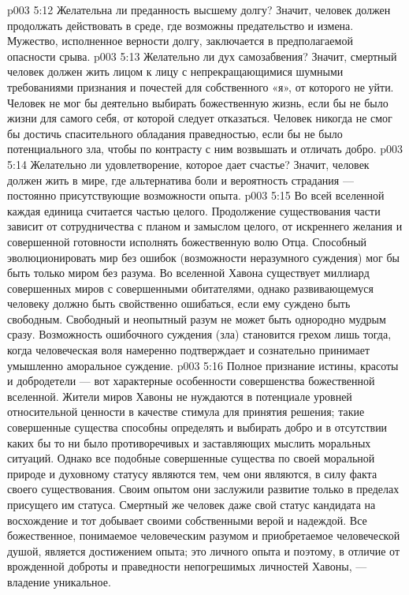 \vs p003 5:12 \bibnobreakspace Желательна ли  преданность высшему долгу? Значит, человек должен продолжать действовать в среде, где возможны предательство и измена. Мужество, исполненное верности долгу, заключается в предполагаемой опасности срыва.
\vs p003 5:13 \bibnobreakspace Желательно ли  дух самозабвения? Значит, смертный человек должен жить лицом к лицу с непрекращающимися шумными требованиями признания и почестей для собственного «я», от которого не уйти. Человек не мог бы деятельно выбирать божественную жизнь, если бы не было жизни для самого себя, от которой следует отказаться. Человек никогда не смог бы достичь спасительного обладания праведностью, если бы не было потенциального зла, чтобы по контрасту с ним возвышать и отличать добро.
\vs p003 5:14 \bibnobreakspace Желательно ли  удовлетворение, которое дает счастье? Значит, человек должен жить в мире, где альтернатива боли и вероятность страдания --- постоянно присутствующие возможности опыта.
\vs p003 5:15 \pc Во всей вселенной каждая единица считается частью целого. Продолжение существования части зависит от сотрудничества с планом и замыслом целого, от искреннего желания и совершенной готовности исполнять божественную волю Отца. Способный эволюционировать мир без ошибок (возможности неразумного суждения) мог бы быть только миром без  разума. Во вселенной Хавона существует миллиард совершенных миров с совершенными обитателями, однако развивающемуся человеку должно быть свойственно ошибаться, если ему суждено быть свободным. Свободный и неопытный разум не может быть однородно мудрым сразу. Возможность ошибочного суждения (зла) становится грехом лишь тогда, когда человеческая воля намеренно подтверждает и сознательно принимает умышленно аморальное суждение.
\vs p003 5:16 \pc Полное признание истины, красоты и добродетели --- вот характерные особенности совершенства божественной вселенной. Жители миров Хавоны не нуждаются в потенциале уровней относительной ценности в качестве стимула для принятия решения; такие совершенные существа способны определять и выбирать добро и в отсутствии каких бы то ни было противоречивых и заставляющих мыслить моральных ситуаций. Однако все подобные совершенные существа по своей моральной природе и духовному статусу являются тем, чем они являются, в силу факта своего существования. Своим опытом они заслужили развитие только в пределах присущего им статуса. Смертный же человек даже свой статус кандидата на восхождение и тот добывает своими собственными верой и надеждой. Все божественное, понимаемое человеческим разумом и приобретаемое человеческой душой, является достижением опыта; это  личного опыта и поэтому, в отличие от врожденной доброты и праведности непогрешимых личностей Хавоны, --- владение уникальное.
